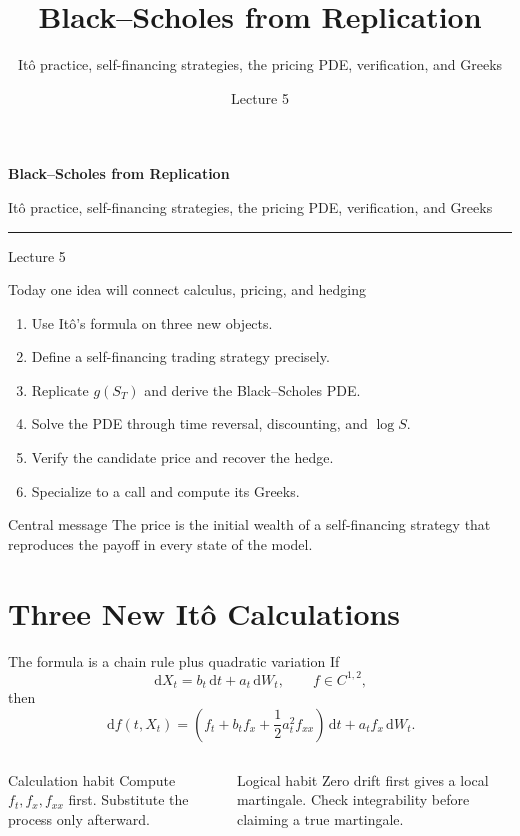 \documentclass[handout,10pt,aspectratio=169]{beamer}
\title{Black--Scholes from Replication}
\subtitle{It\^o practice, self-financing strategies, the pricing PDE, verification, and Greeks}
\author{}
\date{Lecture 5}
\newcommand{\dd}{\,\mathrm d}
\newcommand{\1}{\mathbf 1}
\begin{document}
\begin{frame}[plain]
  \vfill
  {\LARGE\bfseries\color{CourseBlue}Black--Scholes from Replication\par}
  \medskip
  {\large It\^o practice, self-financing strategies, the pricing PDE,
  verification, and Greeks\par}
  \medskip
  {\color{CourseGold}\rule{0.94\textwidth}{0.8pt}}
  \medskip
  {Lecture 5\par}
  \vfill
\end{frame}

\begin{frame}{Today one idea will connect calculus, pricing, and hedging}
\begin{enumerate}
  \item Use It\^o's formula on three new objects.
  \item Define a self-financing trading strategy precisely.
  \item Replicate \(g(S_T)\) and derive the Black--Scholes PDE.
  \item Solve the PDE through time reversal, discounting, and \(\log S\).
  \item Verify the candidate price and recover the hedge.
  \item Specialize to a call and compute its Greeks.
\end{enumerate}
\begin{block}{Central message}
The price is the initial wealth of a self-financing strategy that reproduces
the payoff in every state of the model.
\end{block}
\end{frame}

\section{Three New It\^o Calculations}

\begin{frame}{The formula is a chain rule plus quadratic variation}
If
\[
\dd X_t=b_t\dd t+a_t\dd W_t,
\qquad f\in C^{1,2},
\]
then
\[
\boxed{
\dd f(t,X_t)
=\left(f_t+b_tf_x+\frac12a_t^2f_{xx}\right)\dd t
+a_tf_x\dd W_t.}
\]
\begin{columns}[T,onlytextwidth]
\begin{block}{Calculation habit}
Compute \(f_t,f_x,f_{xx}\) first. Substitute the process only afterward.
\end{block}
\begin{alertblock}{Logical habit}
Zero drift first gives a local martingale. Check integrability before claiming
a true martingale.
\end{alertblock}
\end{columns}
\end{frame}
\end{document}
